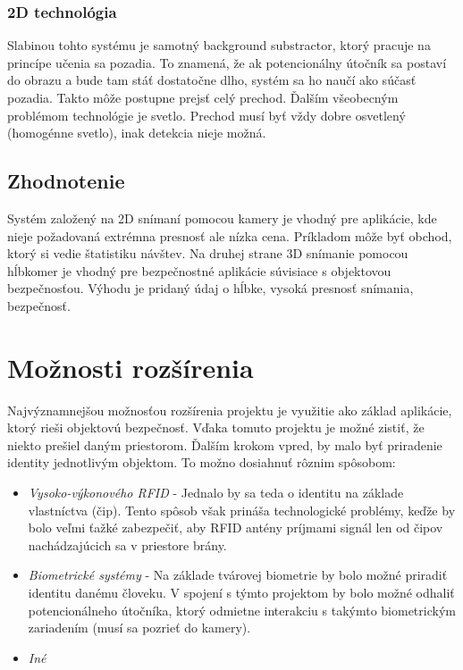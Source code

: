 \subsubsection{2D technológia}
Slabinou tohto systému je samotný background substractor, ktorý pracuje na princípe učenia sa pozadia. To znamená, že ak potencionálny útočník sa postaví do obrazu a bude tam stáť dostatočne dlho, systém sa ho naučí ako súčasť pozadia. Takto môže postupne prejsť celý prechod. Ďalším všeobecným problémom technológie je svetlo. Prechod musí byť vždy dobre osvetlený (homogénne svetlo), inak detekcia nieje možná. 

\vspace{5mm}

\subsection{Zhodnotenie}
Systém založený na 2D snímaní pomocou kamery je vhodný pre aplikácie, kde nieje požadovaná extrémna presnosť ale nízka cena. Príkladom môže byť obchod, ktorý si vedie štatistiku návštev. Na druhej strane 3D snímanie pomocou hĺbkomer je vhodný pre bezpečnostné aplikácie súvisiace s objektovou bezpečnosťou. Výhodu je pridaný údaj o hĺbke, vysoká presnosť snímania, bezpečnosť.       


\section{Možnosti rozšírenia}
Najvýznamnejšou možnosťou rozšírenia projektu je využitie ako základ aplikácie, ktorý rieši objektovú bezpečnosť. Vďaka tomuto projektu je možné zistiť, že niekto prešiel daným priestorom. Ďalším krokom vpred, by malo byť priradenie identity jednotlivým objektom. To možno dosiahnuť rôznim spôsobom: 

\begin{itemize}
\item \textit{Vysoko-výkonového RFID} - Jednalo by sa teda o identitu na základe vlastníctva (čip). Tento spôsob však prináša technologické problémy, keďže by bolo veľmi ťažké zabezpečiť, aby RFID antény príjmami signál len od čipov nachádzajúcich sa v priestore brány. 
\item \textit{Biometrické systémy} - Na základe tvárovej biometrie by bolo možné priradiť identitu danému človeku. V spojení s týmto projektom by bolo možné odhaliť potencionálneho útočníka, ktorý odmietne interakciu s takýmto biometrickým zariadením (musí sa pozrieť do kamery).
\item \textit{Iné} 
\end{itemize}


